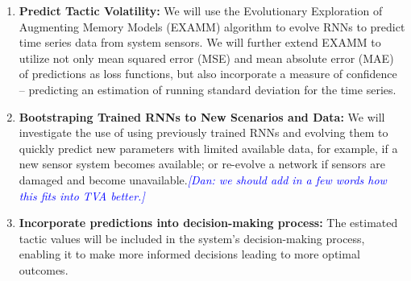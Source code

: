 \documentclass[12pt]{article}
\newcommand{\dan}[1]{\textcolor{blue}{{\it [Dan: #1]}}}
\begin{document}
\begin{enumerate}[noitemsep]

\item \textbf{Predict Tactic Volatility: }We will use the Evolutionary Exploration of Augmenting Memory Models (EXAMM) algorithm to evolve RNNs to predict time series data from system sensors.  We will further extend EXAMM to utilize not only mean squared error (MSE) and mean absolute error (MAE) of predictions as loss functions, but also incorporate a measure of confidence -- predicting an estimation of running standard deviation for the time series.

\item \textbf{Bootstraping Trained RNNs to New Scenarios and Data: }We will investigate the use of using previously trained RNNs and evolving them to quickly predict new parameters with limited available data, for example, if a new sensor system becomes available; or re-evolve a network if sensors are damaged and become unavailable.\dan{we should add in a few words how this fits into TVA better.}

\item \textbf{Incorporate predictions into decision-making process: }The estimated tactic values will be included in the system's decision-making process, enabling it to make more informed decisions leading to more optimal outcomes.




	
\end{enumerate}
\end{document}

